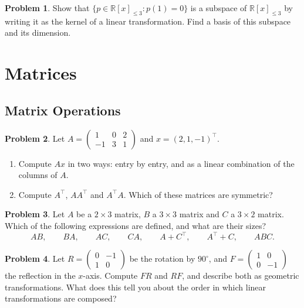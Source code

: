 \documentclass[11pt]{article}
\theoremstyle{definition}
\newtheorem{problem}{Problem}[section]
\begin{document}
\begin{problem}\label{pr:poly-subspace}
    Show that $\{p \in \mathbb{R}[x]_{\leq 3} : p(1) = 0\}$ is a subspace of $\mathbb{R}[x]_{\leq 3}$ by writing it as the kernel of a linear transformation. Find a basis of this subspace and its dimension.
\end{problem}

\section{Matrices}

\subsection{Matrix Operations}

\begin{problem}\label{pr:matvec}
    Let $A = \begin{pmatrix} 1 & 0 & 2 \\ -1 & 3 & 1 \end{pmatrix}$ and $x = (2, 1, -1)^\top$.
    \begin{enumerate}[label=(\alph*)]
        \item Compute $Ax$ in two ways: entry by entry, and as a linear combination of the columns of $A$.
        \item Compute $A^\top$, $AA^\top$ and $A^\top A$. Which of these matrices are symmetric?
    \end{enumerate}
\end{problem}

\begin{problem}\label{pr:sizes}
    Let $A$ be a $2 \times 3$ matrix, $B$ a $3 \times 3$ matrix and $C$ a $3 \times 2$ matrix. Which of the following expressions are defined, and what are their sizes?
    \[AB, \qquad BA, \qquad AC, \qquad CA, \qquad A + C^\top, \qquad A^\top + C, \qquad ABC.\]
\end{problem}

\begin{problem}\label{pr:reflect-rotate}
    Let $R = \begin{pmatrix} 0 & -1 \\ 1 & 0 \end{pmatrix}$ be the rotation by $90^\circ$, and $F = \begin{pmatrix} 1 & 0 \\ 0 & -1 \end{pmatrix}$ the reflection in the $x$-axis. Compute $FR$ and $RF$, and describe both as geometric transformations. What does this tell you about the order in which linear transformations are composed?
\end{problem}
\end{document}
